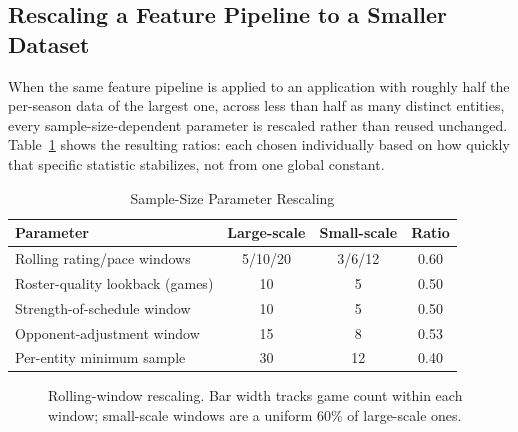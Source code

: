 \documentclass[conference]{IEEEtran}
\begin{document}
\subsection{Rescaling a Feature Pipeline to a Smaller Dataset}
\label{sec:scale-math}

When the same feature pipeline is applied to an application with
roughly half the per-season data of the largest one, across less than
half as many distinct entities, every sample-size-dependent parameter
is rescaled rather than reused unchanged. Table~\ref{tab:scaling}
shows the resulting ratios: each chosen individually based on how
quickly that specific statistic stabilizes, not from one global
constant.

\begin{table}[!t]
\caption{Sample-Size Parameter Rescaling}
\label{tab:scaling}
\centering
\begin{tabular}{lccc}
\toprule
Parameter & Large-scale & Small-scale & Ratio \\
\midrule
Rolling rating/pace windows & 5/10/20 & 3/6/12 & 0.60 \\
Roster-quality lookback (games) & 10 & 5 & 0.50 \\
Strength-of-schedule window & 10 & 5 & 0.50 \\
Opponent-adjustment window & 15 & 8 & 0.53 \\
Per-entity minimum sample & 30 & 12 & 0.40 \\
\bottomrule
\end{tabular}
\end{table}

\begin{figure}[!t]
\centering
{}
\caption{Rolling-window rescaling. Bar width tracks game count within
each window; small-scale windows are a uniform 60\% of large-scale
ones.}
\label{fig:windows}
\end{figure}
\end{document}
